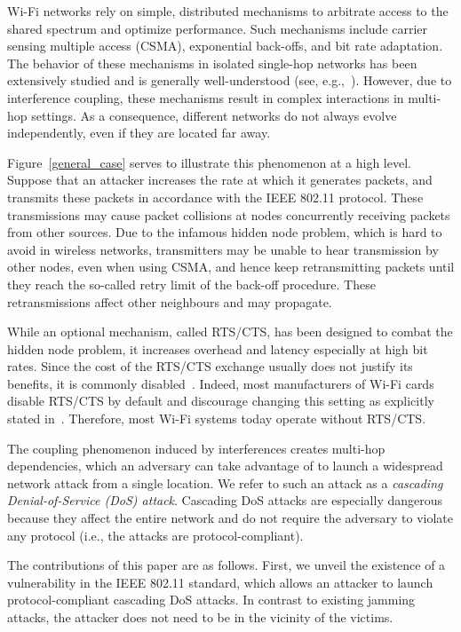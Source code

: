 \documentclass{IEEEtran}
\begin{document}
Wi-Fi networks rely on simple, distributed mechanisms to arbitrate access to the shared spectrum and optimize performance. Such mechanisms include
carrier sensing multiple access (CSMA), exponential back-offs, and bit rate adaptation.  The behavior of these mechanisms in isolated single-hop
networks has been extensively studied and is generally well-understood (see, e.g.,~\cite{bianchi}). However, due to interference coupling, these
mechanisms result in complex interactions in multi-hop settings. As a consequence, different networks do not always evolve independently, even if
they are located far away.

Figure~\ref{general_case} serves to illustrate this phenomenon at a high level. Suppose that an attacker increases the rate at which it generates
packets, and transmits these packets in accordance with the IEEE 802.11 protocol.
These transmissions may cause packet collisions at nodes concurrently receiving packets from other sources. Due to the infamous hidden node problem,
which is hard to avoid in wireless networks, transmitters may be unable to hear transmission by other nodes, even when using CSMA, and hence keep
retransmitting packets until they reach the so-called retry limit of the back-off procedure. These retransmissions affect other neighbours and may
propagate.

While an optional mechanism, called RTS/CTS, has been designed to combat the hidden node problem,
it increases overhead and latency especially
at high bit rates. Since the cost of the RTS/CTS exchange usually does not
justify its benefits, it is commonly
disabled~\cite{forouzan2004data, gast2005802}. Indeed, most manufacturers of Wi-Fi cards disable RTS/CTS by default and discourage changing this
setting as explicitly stated in~\cite{netgear,tp-link,linksys,d-link}.  Therefore, most Wi-Fi systems today operate without RTS/CTS.


The coupling phenomenon induced by interferences
creates multi-hop dependencies, which an adversary can take advantage of to launch a widespread network attack from a single location. We refer to
such an attack as a \emph{cascading Denial-of-Service (DoS) attack}. Cascading DoS attacks are especially dangerous because they affect the entire
network and do not require the adversary to violate any protocol (i.e., the attacks are protocol-compliant).


The contributions of this paper are as follows. First, we unveil the existence of a vulnerability in the IEEE 802.11 standard,
 which allows an attacker to launch protocol-compliant cascading DoS attacks. In contrast to
 existing jamming attacks, the attacker does not need to be in the vicinity of the victims.
\end{document}
